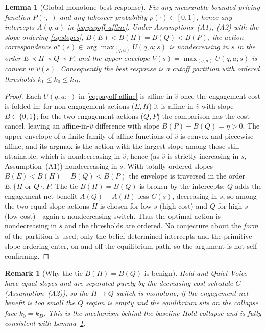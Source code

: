 \documentclass[11pt]{article}
\newtheorem{lemma}{Lemma}
\newcommand{\1}{\mathbf{1}}
\newtheorem{remark}{Remark}
\providecommand{\kone}{k_1}
\providecommand{\kzero}{k_0}
\providecommand{\kD}{k_D}
\providecommand{\vhat}{\hat{v}}
\providecommand{\Ccost}{C}
\begin{document}
\begin{lemma}[Global monotone best response]
\label{lem:monotone}
Fix any measurable bounded pricing function $P(\cdot,\cdot)$ and any takeover probability $p(\cdot)\in[0,1]$, hence any intercepts $A(q,a)$ in \eqref{eq:payoff-affine}. Under Assumptions~\textup{(A1)}, \textup{(A2)} with the slope ordering \eqref{eq:slopes}, $B(E)<B(H)=B(Q)<B(P)$, the action correspondence $a^\star(s)\in\arg\max_{(q,a)}U(q,a;s)$ is nondecreasing in $s$ in the order $E\prec H\prec Q\prec P$, and the upper envelope $V(s)=\max_{(q,a)}U(q,a;s)$ is convex in $\vhat(s)$. Consequently the best response is a cutoff partition with ordered thresholds $\kone\le\kzero\le\kD$.
\end{lemma}

\begin{proof}
Each $U(q,a;\cdot)$ in \eqref{eq:payoff-affine} is affine in $\vhat$ once the engagement cost is folded in: for non-engagement actions ($E,H$) it is affine in $\vhat$ with slope $B\in\{0,1\}$; for the two engagement actions ($Q,P$) the comparison has the cost cancel, leaving an affine-in-$\vhat$ difference with slope $B(P)-B(Q)=\eta>0$. The upper envelope of a finite family of affine functions of $\vhat$ is convex and piecewise affine, and its argmax is the action with the largest slope among those still attainable, which is nondecreasing in $\vhat$, hence (as $\vhat$ is strictly increasing in $s$, Assumption~\textup{(A1)}) nondecreasing in $s$. With totally ordered slopes $B(E)<B(H)=B(Q)<B(P)$ the envelope is traversed in the order $E,\{H\text{ or }Q\},P$. The tie $B(H)=B(Q)$ is broken by the intercepts: $Q$ adds the engagement net benefit $A(Q)-A(H)$ less $\Ccost(s)$, decreasing in $s$, so among the two equal-slope actions $H$ is chosen for low $s$ (high cost) and $Q$ for high $s$ (low cost)---again a nondecreasing switch. Thus the optimal action is nondecreasing in $s$ and the thresholds are ordered. No conjecture about the \emph{form} of the partition is used; only the belief-determined intercepts and the primitive slope ordering enter, on and off the equilibrium path, so the argument is not self-confirming.
\end{proof}

\begin{remark}[Why the tie $B(H)=B(Q)$ is benign]
\label{rem:tie}
Hold and Quiet Voice have equal slopes and are separated purely by the decreasing cost schedule $\Ccost$ (Assumption~\textup{(A2)}), so the $H\!\to\!Q$ switch is monotone; if the engagement net benefit is too small the $Q$ region is empty and the equilibrium sits on the collapse face $\kzero=\kD$. This is the mechanism behind the baseline Hold collapse and is fully consistent with Lemma~\ref{lem:monotone}.
\end{remark}
\end{document}
